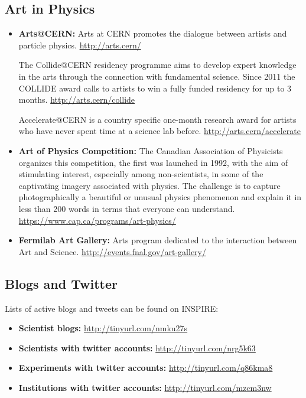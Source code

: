 \subsection{Art in Physics}\label{art-in-physics}

\begin{itemize}
\item
  \textbf{Arts@CERN:} Arts at CERN promotes the dialogue between artists
  and particle physics. \url{http://arts.cern/}

  The Collide@CERN residency programme aims to develop expert knowledge
  in the arts through the connection with fundamental science. Since
  2011 the COLLIDE award calls to artists to win a fully funded
  residency for up to 3 months. \url{http://arts.cern/collide}

  Accelerate@CERN is a country specific one-month research award for
  artists who have never spent time at a science lab before.
  \url{http://arts.cern/accelerate}
\item
  \textbf{Art of Physics Competition:} The Canadian Association of
  Physicists organizes this competition, the first was launched in 1992,
  with the aim of stimulating interest, especially among non-scientists,
  in some of the captivating imagery associated with physics. The
  challenge is to capture photographically a beautiful or unusual
  physics phenomenon and explain it in less than 200 words in terms that
  everyone can understand.
  \url{https://www.cap.ca/programs/art-physics/}
\item
  \textbf{Fermilab Art Gallery:} Arts program dedicated to the
  interaction between Art and Science.
  \url{http://events.fnal.gov/art-gallery/}
\end{itemize}

\subsection{Blogs and Twitter}\label{blogs-and-twitter}

Lists of active blogs and tweets can be found on INSPIRE:

\begin{itemize}
\item
  \textbf{Scientist blogs:} \url{http://tinyurl.com/nmku27s}
\item
  \textbf{Scientists with twitter accounts:}
  \url{http://tinyurl.com/nrg5k63}
\item
  \textbf{Experiments with twitter accounts:}
  \url{http://tinyurl.com/q86kma8}
\item
  \textbf{Institutions with twitter accounts:}
  \url{http://tinyurl.com/mzcm3nw}
\end{itemize}

